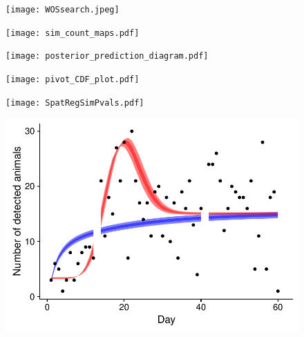 \documentclass[12pt,english]{article}
\begin{document}
\begin{spacing}{1.9}
    \begin{figure}
      \begin{center}
        \texttt{[image: WOSsearch.jpeg]}
        \caption{} \label{fig:WOS}
      \end{center}
    \end{figure}

    \begin{figure}
      \begin{center}
        \texttt{[image: sim\_count\_maps.pdf]}
        \caption{} \label{fig:sim_maps}
      \end{center}
    \end{figure}

    \begin{figure}
      \begin{center}
        \texttt{[image: posterior\_prediction\_diagram.pdf]}
        \caption{} \label{fig:post_pred}
      \end{center}
    \end{figure}

    \begin{figure}
      \begin{center}
        \texttt{[image: pivot\_CDF\_plot.pdf]}
        \caption{} \label{fig:pivotCDF}
      \end{center}
    \end{figure}

    \begin{figure}
      \begin{center}
        \texttt{[image: SpatRegSimPvals.pdf]}
        \caption{} \label{fig:SpatReg_pvals}
      \end{center}
    \end{figure}

    \begin{figure}
      \begin{center}
        \includegraphics[width=170mm]{attendance_fit.pdf}
        \caption{} \label{fig:attend}
      \end{center}
    \end{figure}


  \end{spacing}
\end{document}
